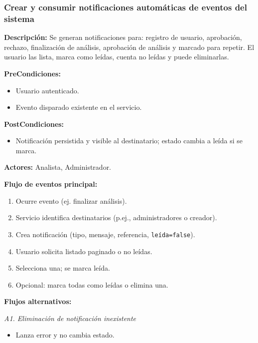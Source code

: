 \subsubsection{Crear y consumir notificaciones automáticas de eventos del sistema}

\textbf{Descripción:} Se generan notificaciones para: registro de usuario, aprobación, rechazo, finalización de análisis, aprobación de análisis y marcado para repetir. El usuario las lista, marca como leídas, cuenta no leídas y puede eliminarlas.

\vspace{0.5em}
\noindent\textbf{PreCondiciones:}
\begin{itemize}[nosep]
    \item Usuario autenticado.
    \item Evento disparado existente en el servicio.
\end{itemize}

\vspace{0.5em}
\noindent\textbf{PostCondiciones:}
\begin{itemize}[nosep]
    \item Notificación persistida y visible al destinatario; estado cambia a leída si se marca.
\end{itemize}

\vspace{0.5em}
\noindent\textbf{Actores:} Analista, Administrador.

\vspace{0.5em}
\noindent\textbf{Flujo de eventos principal:}
\begin{enumerate}[nosep]
    \item Ocurre evento (ej. finalizar análisis).
    \item Servicio identifica destinatarios (p.ej., administradores o creador).
    \item Crea notificación (tipo, mensaje, referencia, \texttt{leída=false}).
    \item Usuario solicita listado paginado o no leídas.
    \item Selecciona una; se marca leída.
    \item Opcional: marca todas como leídas o elimina una.
\end{enumerate}

\vspace{0.5em}
\noindent\textbf{Flujos alternativos:}

\vspace{0.3em}
\noindent\textit{A1. Eliminación de notificación inexistente}
\begin{itemize}[nosep]
    \item Lanza error y no cambia estado.
\end{itemize}

